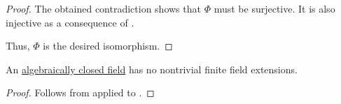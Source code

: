 \begin{proof}
  The obtained contradiction shows that \( \Phi \) must be surjective. It is also injective as a consequence of .

  Thus, \( \Phi \) is the desired isomorphism.
\end{proof}

\begin{proposition}\label{thm:no_finite_extensions_of_closed_fields}
  An \hyperref[def:algebraically_closed_field]{algebraically closed field} has no nontrivial finite field extensions.
\end{proposition}
\begin{proof}
  Follows from  applied to .
\end{proof}
